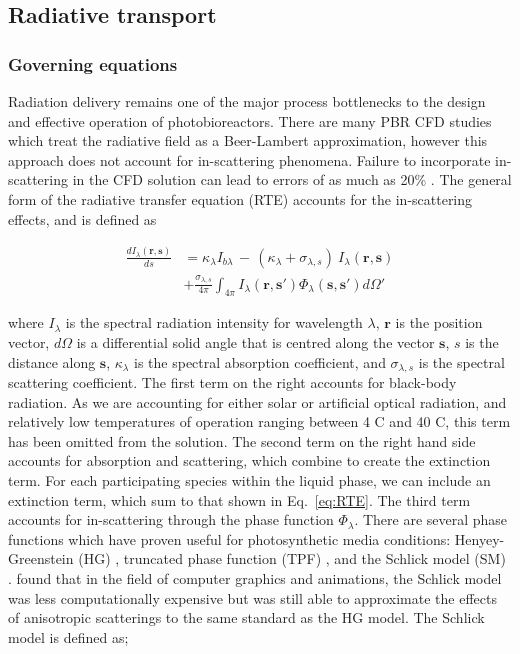 \subsection{Radiative transport}
\subsubsection{Governing equations}
Radiation delivery remains one of the major process bottlenecks to the design and effective operation of photobioreactors. There are many PBR CFD studies which treat the radiative field as a Beer-Lambert approximation, however this approach does not account for in-scattering phenomena. Failure to incorporate in-scattering in the CFD solution can lead to errors of as much as 20\% \cite{berberoglu2007}. The general form of the radiative transfer equation (RTE) accounts for the in-scattering effects, and is defined as

\begin{align}
\frac{dI_\lambda (\mathbf{r}, \mathbf{s}) }{ds} &=  \kappa_{\lambda}I_{b\lambda} \, - \, (\kappa_\lambda + \sigma_{\lambda, s}) \ I_\lambda (\mathbf{r}, \mathbf{s}) \nonumber \\
&+ \frac{\sigma_{\lambda, s}}{4 \pi} \int_{4 \pi} I_\lambda (\mathbf{r}, \mathbf{s'}) \Phi_\lambda(\mathbf{s}, \mathbf{s'}) d\Omega'
\label{eq:RTE}
\end{align}


\noindent where $I_\lambda$ is the spectral radiation intensity for wavelength $\lambda$, $\mathbf{r}$ is the position vector, $d\Omega$ is a differential solid angle that is centred along the vector $\mathbf{s}$, $s$ is the distance along $\mathbf{s}$, $\kappa_\lambda$ is the spectral absorption coefficient, and $\sigma_{\lambda,s}$ is the spectral scattering coefficient. The first term on the right accounts for black-body radiation. As we are accounting for either solar or artificial optical radiation, and relatively low temperatures of operation ranging between 4 \degree C and 40 \degree C, this term has been omitted from the solution. The second term on the right hand side accounts for absorption and scattering,  which combine to create the extinction term. For each participating species within the liquid phase, we can include an extinction term, which sum to that shown in Eq.\ \ref{eq:RTE}. The third term accounts for in-scattering through the phase function $\Phi_\lambda$. 
\skippingparagraph
There are several phase functions which have proven useful for photosynthetic media conditions: Henyey-Greenstein (HG) \cite{kong2014}, truncated phase function (TPF) \cite{berberoglu2007}, and the Schlick model (SM) \cite{jarosz2008}. \cite{jarosz2008} found that in the field of computer graphics and animations, the Schlick model was less computationally expensive but was still able to approximate the effects of anisotropic scatterings to the same standard as the HG model. The Schlick model is defined as;


